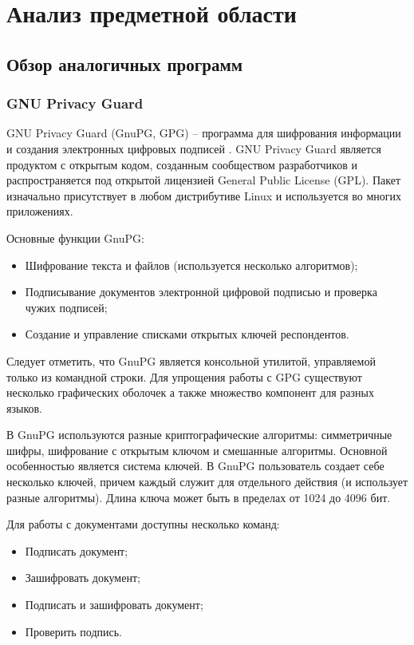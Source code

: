 \newpage
\section{Анализ предметной области}\label{sec:razd1}

\subsection{Обзор аналогичных программ}
\label{ssec:obzor}

\subsubsection{GNU Privacy Guard}


GNU Privacy Guard (GnuPG, GPG) -- программа для шифрования
информации и создания электронных цифровых подписей \cite{gnupg}.
GNU Privacy Guard является продуктом с открытым кодом, созданным
сообществом разработчиков и распространяется под открытой лицензией General Public License (GPL).
Пакет изначально присутствует в любом дистрибутиве Linux и
используется во многих приложениях.

Основные функции GnuPG:
\begin{itemize}
    \item Шифрование текста и файлов (используется несколько алгоритмов);
    \item Подписывание документов электронной цифровой подписью и проверка чужих подписей;
    \item Создание и управление списками открытых ключей респондентов.
\end{itemize}

Следует отметить, что GnuPG является консольной утилитой, управляемой только из
командной строки. Для упрощения работы с GPG существуют несколько
графических оболочек а также множество компонент для разных языков.

В GnuPG используются разные криптографические алгоритмы: симметричные шифры,
шифрование с открытым ключом и смешанные алгоритмы.
Основной особенностью является система ключей. В GnuPG пользователь создает себе несколько
ключей, причем каждый служит для отдельного действия (и использует разные
алгоритмы). Длина ключа может быть в пределах от 1024 до 4096 бит.

Для работы с документами доступны несколько команд:
\begin{itemize}
    \item Подписать документ;
    \item Зашифровать документ;
    \item Подписать и зашифровать документ;
    \item Проверить подпись.
\end{itemize}

